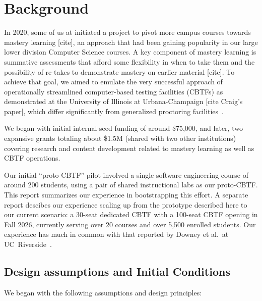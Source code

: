 \section{Background}

In 2020, some of us at \inst{} initiated a project to pivot
more campus courses towards mastery learning [cite], an approach that
had been gaining popularity in our large lower division Computer
Science courses. A key component of mastery learning is summative
assessments that afford some flexibility in when to take them and the
possibility of re-takes to demonstrate mastery on earlier material
[cite].  To achieve that goal, we aimed to emulate the very successful
approach of operationally streamlined computer-based testing
facilities (CBTFs) as demonstrated at the University of Illinois at
Urbana-Champaign [cite Craig’s paper], which differ significantly from
generalized proctoring facilities~\cite{fox-cbtf-not-proctoring}.

We began with initial internal seed funding of around \$75,000, and
later, two expansive grants totaling about \$1.5M (shared with two
other institutions) covering research and content development related
to mastery learning as well as CBTF operations.

Our initial ``proto-CBTF'' pilot involved a single software engineering course
of around 200 students, using a pair of shared instructional labs as
our proto-CBTF.
This report summarizes our experience in bootstrapping this
effort.  A separate report
descibes our experience scaling up from the prototype described here to our
current scenario: a 30-seat dedicated CBTF with a 100-seat CBTF
opening in Fall 2026, currently serving over 20 courses and over 5,500
enrolled students. Our experience has much in common with that
reported by  Downey et al.\ at UC~Riverside~\cite{downey-cbtf}.


\subsection{Design assumptions and Initial Conditions}

We began with the following assumptions and design principles:

